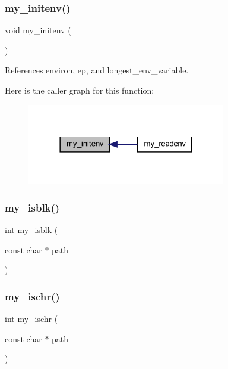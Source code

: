 \subsubsection{\texorpdfstring{my\+\_\+initenv()}{my\_initenv()}}
{\footnotesize\ttfamily void my\+\_\+initenv (\begin{DoxyParamCaption}{ }\end{DoxyParamCaption})}



References environ, ep, and longest\+\_\+env\+\_\+variable.

Here is the caller graph for this function\+:
\nopagebreak
\begin{figure}[H]
\begin{center}
\leavevmode
\includegraphics[width=246pt]{C-M__system_8c_ab5188f2ca99719a14c77a1acae06f93a_icgraph}
\end{center}
\end{figure}
\mbox{\label{C-M__system_8c_ad07b549d969a0670b0b8f7c6bef83e92}} 
\subsubsection{\texorpdfstring{my\+\_\+isblk()}{my\_isblk()}}
{\footnotesize\ttfamily int my\+\_\+isblk (\begin{DoxyParamCaption}\item[{const char $\ast$}]{path }\end{DoxyParamCaption})}

\mbox{\label{C-M__system_8c_ae59ec13b3517e84ddd30a0cd5352a01d}} 
\subsubsection{\texorpdfstring{my\+\_\+ischr()}{my\_ischr()}}
{\footnotesize\ttfamily int my\+\_\+ischr (\begin{DoxyParamCaption}\item[{const char $\ast$}]{path }\end{DoxyParamCaption})}


